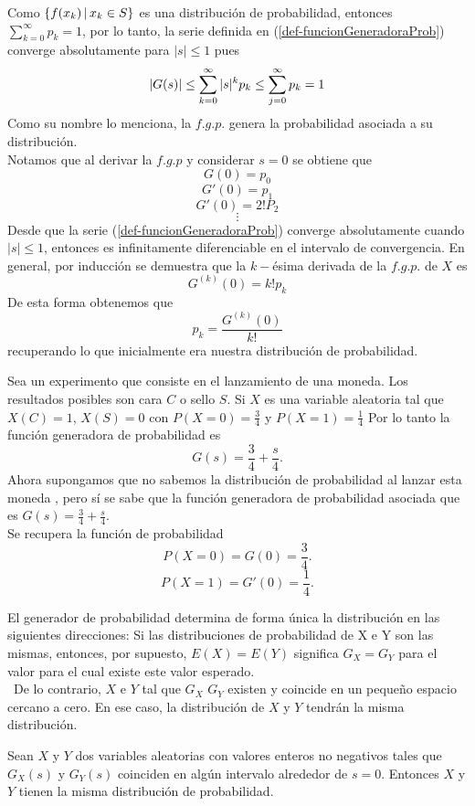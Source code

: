 Como $\{f(x_k)\thinspace|\thinspace x_k\in S\}$ es una distribución de probabilidad, entonces\\ $\sum_{k=0}^\infty p_k=1$, por lo tanto, la serie definida en (\ref{def-funcionGeneradoraProb}) converge absolutamente para $|s|\leq 1$ pues $$|G(s)|\leq \sum_{k=0}^\infty|s|^k p_k\leq\sum_{j=0}^{\infty} p_k=1 $$ 
Como su nombre lo menciona, la $f.g.p.$ genera la probabilidad asociada a su distribución.\\
Notamos que al derivar la $f.g.p$ y considerar $s=0$ se obtiene que
$$G(0)=p_0$$ $$G'(0)=p_1$$ $$G'(0)=2!P_2$$ $$\vdots$$Desde que la serie (\ref{def-funcionGeneradoraProb}) converge absolutamente cuando $|s|\leq 1$, entonces es infinitamente diferenciable en el intervalo de convergencia. En general, por inducción se demuestra que la $k-$ésima derivada de la $f.g.p.$ de $X$ es $$G^{(k)}(0)=k!p_k$$
De esta forma obtenemos que $$p_k=\frac{G^{(k)}(0)}{k!}$$ recuperando lo que inicialmente era nuestra distribución de probabilidad.\\
\begin{Ejm}
    Sea un experimento que consiste en el lanzamiento de una moneda. Los resultados posibles son cara $C$ o sello $S$. Si $X$ es una variable aleatoria tal que $X(C)=1$, $X(S)=0$ con $P(X=0)=\frac{3}{4}$ y $P(X=1)=\frac{1}{4}$
    Por lo tanto la función generadora de probabilidad es
    $$G(s)=\frac{3}{4}+\frac{s}{4}.$$
    Ahora supongamos que no sabemos la distribución de probabilidad al lanzar esta moneda , pero sí se sabe que la función generadora de probabilidad asociada que es $G(s)=\frac{3}{4}+\frac{s}{4}.$\\
    Se recupera la función de probabilidad 
    $$P(X=0)=G(0)=\frac{3}{4}.$$    $$P(X=1)=G'(0)=\frac{1}{4}.$$
\end{Ejm}
El generador de probabilidad determina de forma única la distribución en las siguientes direcciones: Si las distribuciones de probabilidad de X e Y son las mismas, entonces, por supuesto, $E(X) = E(Y)$ significa $G_X = G_Y$ para el valor para el cual existe este valor esperado. \\ \
De lo contrario, $ X $ e $ Y $ tal que $ G_X $
$ G_Y $ existen y coincide en un pequeño espacio cercano a cero.
En ese caso, la distribución de $ X $ y $ Y $ tendrán la misma distribución.
\begin{Prop}
    Sean $X$ y $Y$ dos variables aleatorias con valores enteros no negativos tales que $G_X(s)$ y $G_Y(s)$ coinciden en algún intervalo alrededor de $s=0$. Entonces $X$ y $Y$ tienen la misma distribución de probabilidad. \label{prop-funcionGenIgual-distribucuionIgual}
\end{Prop}

